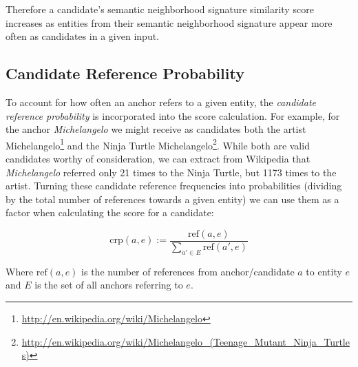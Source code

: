 \documentclass[runningheads,a4paper]{llncs}
\begin{document}
{Therefore a candidate's semantic neighborhood signature similarity score increases as entities from their semantic neighborhood signature appear more often as candidates in a given input.

\subsection{Candidate Reference Probability}

To account for how often an anchor refers to a given entity, the \emph{candidate reference probability} is incorporated into the score calculation. For example, for the anchor \textit{Michelangelo} we might receive as candidates both the artist Michelangelo\footnote{\url{http://en.wikipedia.org/wiki/Michelangelo}} and the Ninja Turtle Michelangelo\footnote{\url{http://en.wikipedia.org/wiki/Michelangelo_(Teenage_Mutant_Ninja_Turtles)}}. While both are valid candidates worthy of consideration, we can extract from Wikipedia that \textit{Michelangelo} referred only 21 times to the Ninja Turtle, but 1173 times to the artist. Turning these candidate reference frequencies into probabilities (dividing by the total number of references towards a given entity) we can use them as a factor when calculating the score for a candidate:

$$\mathrm{crp}(a, e) := \frac{\mathrm{ref}(a, e)}{{\sum\limits_{a'\in E} \mathrm{ref}(a', e)}}$$

Where $\mathrm{ref}(a, e)$ is the number of references from anchor/candidate $a$ to entity $e$ and $E$ is the set of all anchors referring to $e$.

}
\end{document}
